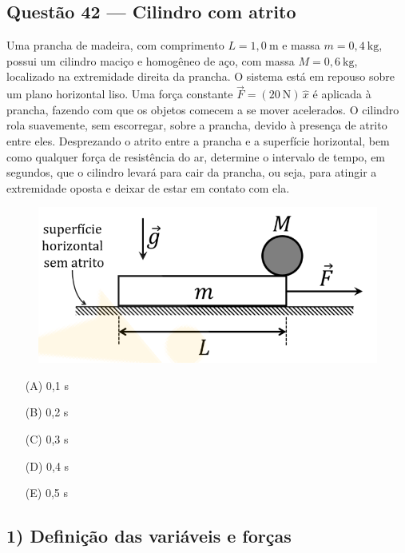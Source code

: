 \documentclass[a4paper,12pt]{article}
\begin{document}
\begin{flushleft}
\subsection{Quest\~ao 42 — Cilindro com atrito}

Uma prancha de madeira, com comprimento $L = 1{,}0\ \text{m}$ e massa $m = 0{,}4\ \text{kg}$, 
possui um cilindro maciço e homogêneo de aço, com massa $M = 0{,}6\ \text{kg}$, 
localizado na extremidade direita da prancha. 
O sistema está em repouso sobre um plano horizontal liso. 
Uma força constante $\vec{F} = (20\ \text{N})\,\hat{x}$ é aplicada à prancha, 
fazendo com que os objetos comecem a se mover acelerados. 
O cilindro rola suavemente, sem escorregar, sobre a prancha, devido à presença de atrito entre eles. 
Desprezando o atrito entre a prancha e a superfície horizontal, bem como qualquer força de resistência do ar, 
determine o intervalo de tempo, em segundos, que o cilindro levará para cair da prancha, ou seja, 
para atingir a extremidade oposta e deixar de estar em contato com ela. 

\begin{figure}[!h]
  \centering
  \includegraphics[scale=0.5]{figures/q42.png}
\end{figure}

\begin{itemize}
\item[(A)] 0,1 s
\item[(B)] 0,2 s
\item[(C)] 0,3 s
\item[(D)] 0,4 s
\item[(E)] 0,5 s
\end{itemize}

\subsection*{1) Definição das variáveis e forças}


\end{flushleft}
\end{document}
